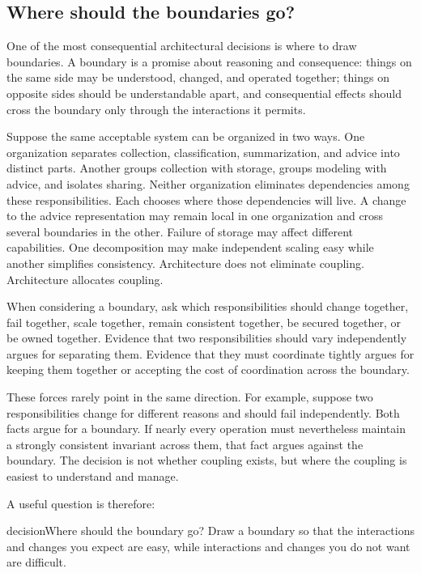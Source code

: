 \subsection{Where should the boundaries go?}\label{sec-boundaries}

One of the most consequential architectural decisions is where to draw boundaries. A boundary is a
promise about reasoning and consequence: things on the same side may be understood, changed, and
operated together; things on opposite sides should be understandable apart, and consequential
effects should cross the boundary only through the interactions it permits.

Suppose the same acceptable system can be organized in two ways. One organization separates
collection, classification, summarization, and advice into distinct parts. Another groups
collection with storage, groups modeling with advice, and isolates sharing. Neither organization
eliminates dependencies among these responsibilities. Each chooses where those dependencies will
live. A change to the advice representation may remain local in one organization and cross several
boundaries in the other. Failure of storage may affect different capabilities. One decomposition
may make independent scaling easy while another simplifies consistency. Architecture does not
eliminate coupling. Architecture allocates coupling.

When considering a boundary, ask which responsibilities should change together, fail together,
scale together, remain consistent together, be secured together, or be owned together. Evidence
that two responsibilities should vary independently argues for separating them. Evidence that they
must coordinate tightly argues for keeping them together or accepting the cost of coordination
across the boundary.

These forces rarely point in the same direction. For example, suppose two responsibilities change
for different reasons and should fail independently. Both facts argue for a boundary. If nearly
every operation must nevertheless maintain a strongly consistent invariant across them, that fact
argues against the boundary. The decision is not whether coupling exists, but where the coupling
is easiest to understand and manage.

A useful question is therefore:

\begin{bookbox}{decision}{Where should the boundary go?} %
Draw a boundary so that the interactions and changes you expect are easy, while interactions and
changes you do not want are difficult.
\end{bookbox}

